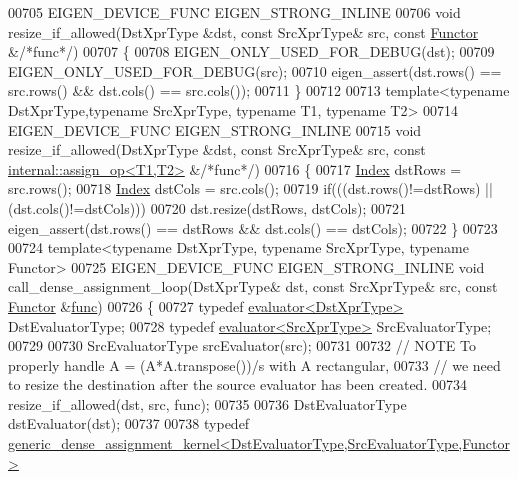 \begin{DoxyCode}
00705 EIGEN\_DEVICE\_FUNC EIGEN\_STRONG\_INLINE
00706 \textcolor{keywordtype}{void} resize\_if\_allowed(DstXprType &dst, \textcolor{keyword}{const} SrcXprType& src, \textcolor{keyword}{const} \hyperlink{struct_functor}{Functor} &\textcolor{comment}{/*func*/})
00707 \{
00708   EIGEN\_ONLY\_USED\_FOR\_DEBUG(dst);
00709   EIGEN\_ONLY\_USED\_FOR\_DEBUG(src);
00710   eigen\_assert(dst.rows() == src.rows() && dst.cols() == src.cols());
00711 \}
00712 
00713 \textcolor{keyword}{template}<\textcolor{keyword}{typename} DstXprType,\textcolor{keyword}{typename} SrcXprType, \textcolor{keyword}{typename} T1, \textcolor{keyword}{typename} T2>
00714 EIGEN\_DEVICE\_FUNC EIGEN\_STRONG\_INLINE
00715 \textcolor{keywordtype}{void} resize\_if\_allowed(DstXprType &dst, \textcolor{keyword}{const} SrcXprType& src, \textcolor{keyword}{const} 
      \hyperlink{struct_eigen_1_1internal_1_1assign__op}{internal::assign\_op<T1,T2>} &\textcolor{comment}{/*func*/})
00716 \{
00717   \hyperlink{namespace_eigen_a62e77e0933482dafde8fe197d9a2cfde}{Index} dstRows = src.rows();
00718   \hyperlink{namespace_eigen_a62e77e0933482dafde8fe197d9a2cfde}{Index} dstCols = src.cols();
00719   \textcolor{keywordflow}{if}(((dst.rows()!=dstRows) || (dst.cols()!=dstCols)))
00720     dst.resize(dstRows, dstCols);
00721   eigen\_assert(dst.rows() == dstRows && dst.cols() == dstCols);
00722 \}
00723 
00724 \textcolor{keyword}{template}<\textcolor{keyword}{typename} DstXprType, \textcolor{keyword}{typename} SrcXprType, \textcolor{keyword}{typename} Functor>
00725 EIGEN\_DEVICE\_FUNC EIGEN\_STRONG\_INLINE \textcolor{keywordtype}{void} call\_dense\_assignment\_loop(DstXprType& dst, \textcolor{keyword}{const} SrcXprType& 
      src, \textcolor{keyword}{const} \hyperlink{struct_functor}{Functor} &\hyperlink{structfunc}{func})
00726 \{
00727   \textcolor{keyword}{typedef} \hyperlink{struct_eigen_1_1internal_1_1evaluator}{evaluator<DstXprType>} DstEvaluatorType;
00728   \textcolor{keyword}{typedef} \hyperlink{struct_eigen_1_1internal_1_1evaluator}{evaluator<SrcXprType>} SrcEvaluatorType;
00729 
00730   SrcEvaluatorType srcEvaluator(src);
00731 
00732   \textcolor{comment}{// NOTE To properly handle A = (A*A.transpose())/s with A rectangular,}
00733   \textcolor{comment}{// we need to resize the destination after the source evaluator has been created.}
00734   resize\_if\_allowed(dst, src, func);
00735 
00736   DstEvaluatorType dstEvaluator(dst);
00737     
00738   \textcolor{keyword}{typedef} 
      \hyperlink{class_eigen_1_1internal_1_1generic__dense__assignment__kernel}{generic\_dense\_assignment\_kernel<DstEvaluatorType,SrcEvaluatorType,Functor>}

\end{DoxyCode}
